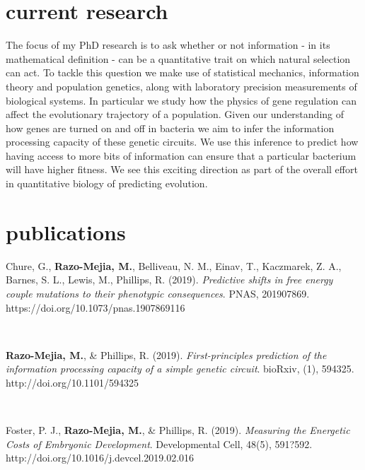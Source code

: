 \documentclass[]{friggeri-cv}
\begin{document}
\section{current research}

The focus of my PhD research is to ask whether or not information - in its mathematical definition - can be a quantitative trait on which natural selection can act. To tackle this question we make use of statistical mechanics, information theory and population genetics, along with laboratory precision measurements of biological systems. In particular we study how the physics of gene regulation can affect the evolutionary trajectory of a population. Given our understanding of how genes are turned on and off in bacteria we aim to infer the information processing capacity of these genetic circuits. We use this inference to predict how having access to more bits of information can ensure that a particular bacterium will have higher fitness. We see this exciting direction as part of the overall effort in quantitative biology of predicting evolution.

\section{publications}
\begin{flushleft}
Chure, G., \textbf{Razo-Mejia, M.}, Belliveau, N. M., Einav, T., Kaczmarek, Z. A., Barnes, S. L., Lewis, M., Phillips, R. (2019). \textit{Predictive shifts in free energy couple mutations to their phenotypic consequences}. PNAS, 201907869. \linebreak
https://doi.org/10.1073/pnas.1907869116
\end{flushleft}\\

\begin{flushleft}
\textbf{Razo-Mejia, M.}, & Phillips, R. (2019). \textit{First-principles prediction of the information processing capacity of a simple genetic circuit}. bioRxiv, (1), 594325.\linebreak
http://doi.org/10.1101/594325
\end{flushleft}\\

\begin{flushleft}
Foster, P. J., \textbf{Razo-Mejia, M.}, & Phillips, R. (2019). \textit{Measuring the Energetic Costs of Embryonic Development}. Developmental Cell, 48(5), 591?592.\linebreak
http://doi.org/10.1016/j.devcel.2019.02.016
\end{flushleft}\\
\end{document}
